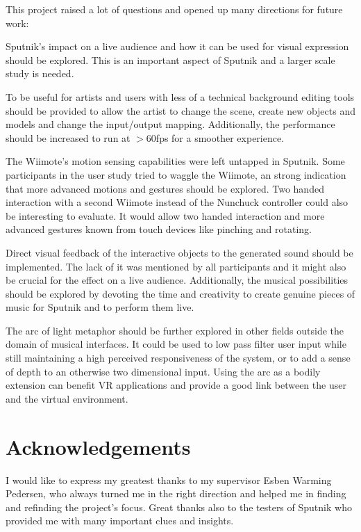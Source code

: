 \documentclass[10pt,a4paper]{scrartcl}
\begin{document}
This project raised a lot of questions and opened up many directions for future work:

Sputnik's impact on a live audience and how it can be used for visual expression should be explored. This is an important aspect of Sputnik and a larger scale study is needed.

To be useful for artists and users with less of a technical background editing tools should be provided to allow the artist to change the scene, create new objects and models and change the input/output mapping. Additionally, the performance should be increased to run at $> 60$fps for a smoother experience.

The Wiimote's motion sensing capabilities were left untapped in Sputnik. Some participants in the user study tried to waggle the Wiimote, an strong indication that more advanced motions and gestures should be explored. Two handed interaction with a second Wiimote instead of the Nunchuck controller could also be interesting to evaluate. It would allow two handed interaction and more advanced gestures known from touch devices like pinching and rotating. 

Direct visual feedback of the interactive objects to the generated sound should be implemented. The lack of it was mentioned by all participants and it might also be crucial for the effect on a live audience. Additionally, the musical possibilities should be explored by devoting the time and creativity to create genuine pieces of music for Sputnik and to perform them live.

The arc of light metaphor should be further explored in other fields outside the domain of musical interfaces. It could be used to low pass filter user input while still maintaining a high perceived responsiveness of the system, or to add a sense of depth to an otherwise two dimensional input. Using the arc as a bodily extension can benefit VR applications and provide a good link between the user and the virtual environment.



\section{Acknowledgements}
I would like to express my greatest thanks to my supervisor Esben Warming Pedersen, who always turned me in the right direction and helped me in finding and refinding the project's focus. Great thanks also to the testers of Sputnik who provided me with many important clues and insights. 
\end{document}

